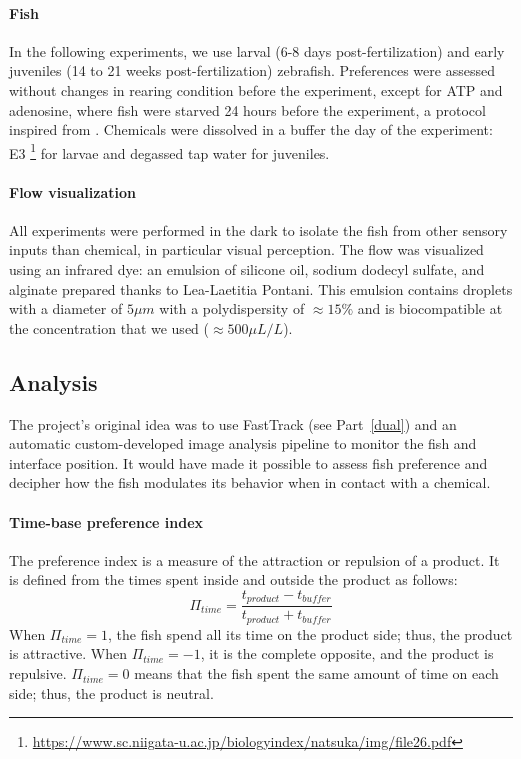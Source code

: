   \paragraph{Fish} In the following experiments, we use larval (6-8 days post-fertilization) and early juveniles (14 to 21 weeks post-fertilization) zebrafish. Preferences were assessed without changes in rearing condition before the experiment, except for ATP and adenosine, where fish were starved 24 hours before the experiment, a protocol inspired from \cite{wakisaka2017adenosine}. Chemicals were dissolved in a buffer the day of the experiment: E3 \footnote{\url{https://www.sc.niigata-u.ac.jp/biologyindex/natsuka/img/file26.pdf}} for larvae and degassed tap water for juveniles.

  \paragraph{Flow visualization} All experiments were performed in the dark to isolate the fish from other sensory inputs than chemical, in particular visual perception. The flow was visualized using an infrared dye: an emulsion of silicone oil, sodium dodecyl sulfate, and alginate prepared thanks to Lea-Laetitia Pontani. This emulsion contains droplets with a diameter of $5 \mu m$ with a polydispersity of $\approx 15 \%$ and is biocompatible \cite{ali2011large} at the concentration that we used ($\approx 500 \mu L/L$).

  \subsection{Analysis}
  The project's original idea was to use FastTrack (see Part~\ref{dual}) and an automatic custom-developed image analysis pipeline to monitor the fish and interface position. It would have made it possible to assess fish preference and decipher how the fish modulates its behavior when in contact with a chemical.

  \paragraph{Time-base preference index} The preference index is a measure of the attraction or repulsion of a product. It is defined from the times spent inside and outside the product as follows:
  \begin{equation}
    \Pi_{time}=\frac{t_{product}-t_{buffer}}{t_{product}+t_{buffer}}
  \end{equation}
  \noindent When $\Pi_{time} = 1$, the fish spend all its time on the product side; thus, the product is attractive. When $\Pi_{time} = -1$, it is the complete opposite, and the product is repulsive. $\Pi_{time} = 0$ means that the fish spent the same amount of time on each side; thus, the product is neutral.

